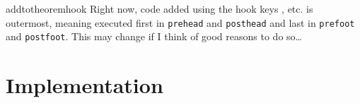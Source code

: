\documentclass{ltxdoc}
\newcommand{\hook}{\texttt}
\begin{document}
\begin{docCommand}{addtotheoremhook}
Right now, code added using the hook keys , etc. is outermost, meaning executed first in \hook{prehead} and \hook{posthead} and last in \hook{prefoot} and \hook{postfoot}. This may change if I think of good reasons to do so\dots
\end{docCommand}

\section{Implementation}

\inputminted[linenos]{latex}{../keytheorems.sty}

\printindex
\end{document}
